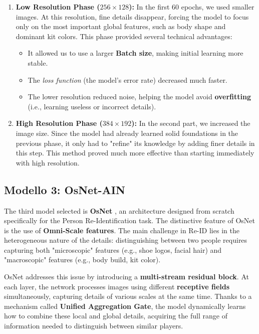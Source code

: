 \documentclass[10pt,twocolumn,letterpaper]{article}
\begin{document}
\begin{enumerate}
    \item \textbf{Low Resolution Phase ($256 \times 128$):} 
    In the first 60 epochs, we used smaller images. At this resolution, fine details disappear, forcing the model to focus only on the most important global features, such as body shape and dominant kit colors. This phase provided several technical advantages:
    \begin{itemize}
        \item It allowed us to use a larger \textbf{Batch size}, making initial learning more stable.
        \item The \textit{loss function} (the model's error rate) decreased much faster.
        \item The lower resolution reduced noise, helping the model avoid \textbf{overfitting} (i.e., learning useless or incorrect details).
    \end{itemize}
    
    \item \textbf{High Resolution Phase ($384 \times 192$):} 
    In the second part, we increased the image size. Since the model had already learned solid foundations in the previous phase, it only had to "refine" its knowledge by adding finer details in this step. This method proved much more effective than starting immediately with high resolution.
\end{enumerate}


\subsection{Modello 3: OsNet-AIN}
The third model selected is \textbf{OsNet} \cite{osnet_iccv}, an architecture designed from scratch specifically for the Person Re-Identification task. 
The distinctive feature of OsNet is the use of \textbf{Omni-Scale features}. The main challenge in Re-ID lies in the heterogeneous nature of the details: distinguishing between two people requires capturing both "microscopic" features (e.g., shoe logos, facial hair) and "macroscopic" features (e.g., body build, kit color).

OsNet addresses this issue by introducing a \textbf{multi-stream residual block}. At each layer, the network processes images using different \textbf{receptive fields} simultaneously, capturing details of various scales at the same time. Thanks to a mechanism called \textbf{Unified Aggregation Gate}, the model dynamically learns how to combine these local and global details, acquiring the full range of information needed to distinguish between similar players.
\end{document}
